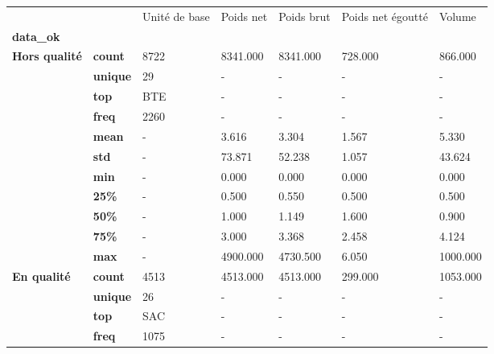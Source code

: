 \begin{tabularx}{\linewidth}{lXXXXXX}
\toprule
           &     & Unité de base &  Poids net &  Poids brut &  Poids net égoutté &    Volume \\
\textbf{data\_ok} & {} &               &            &             &                    &           \\
\midrule
\multirow{11}{*}{\textbf{Hors qualité}} & \textbf{count} &          8722 &   8341.000 &    8341.000 &            728.000 &   866.000 \\
           & \textbf{unique} &            29 &          - &           - &                  - &         - \\
           & \textbf{top} &           BTE &          - &           - &                  - &         - \\
           & \textbf{freq} &          2260 &          - &           - &                  - &         - \\
           & \textbf{mean} &             - &      3.616 &       3.304 &              1.567 &     5.330 \\
           & \textbf{std} &             - &     73.871 &      52.238 &              1.057 &    43.624 \\
           & \textbf{min} &             - &      0.000 &       0.000 &              0.000 &     0.000 \\
           & \textbf{25\%} &             - &      0.500 &       0.550 &              0.500 &     0.500 \\
           & \textbf{50\%} &             - &      1.000 &       1.149 &              1.600 &     0.900 \\
           & \textbf{75\%} &             - &      3.000 &       3.368 &              2.458 &     4.124 \\
           & \textbf{max} &             - &   4900.000 &    4730.500 &              6.050 &  1000.000 \\
\cline{1-7}
\multirow{11}{*}{\textbf{En qualité}} & \textbf{count} &          4513 &   4513.000 &    4513.000 &            299.000 &  1053.000 \\
           & \textbf{unique} &            26 &          - &           - &                  - &         - \\
           & \textbf{top} &           SAC &          - &           - &                  - &         - \\
           & \textbf{freq} &          1075 &          - &           - &                  - &         - \\

\end{tabularx}
